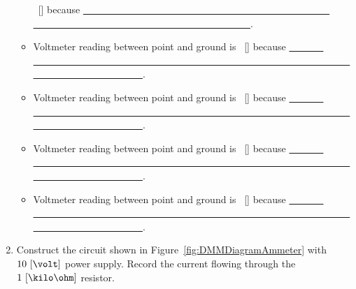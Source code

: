 \begin{enumerate}
\begin{itemize}
  \underline{\hspace{2.0 cm}}~[\volt] because
  \ul{~~~~~~~ ~~~~~~~~~ ~~~~~~~~ ~~~~~~~~~ ~~~~~ ~~~~~~~~~ ~~~~~~~ ~~~~~~
    ~~~~~~~ ~~~~~~~ ~~~~~~~~ ~~~~~~}.  
\item Voltmeter reading between point
   and ground is
  \underline{\hspace{2.0 cm}}~[\volt] because
  \ul{~~~~~~~ ~~~~~~~~~ ~~~~~~~~ ~~~~~~~~~ ~~~~~ ~~~~~~~~~ ~~~~~~~ ~~~~~~
    ~~~~~~~ ~~~~~~~ ~~~~~~~~ ~~~~~~}.  
\item Voltmeter reading between point
   and ground is
  \underline{\hspace{2.0 cm}}~[\volt] because
  \ul{~~~~~~~ ~~~~~~~~~ ~~~~~~~~ ~~~~~~~~~ ~~~~~ ~~~~~~~~~ ~~~~~~~ ~~~~~~
    ~~~~~~~ ~~~~~~~ ~~~~~~~~ ~~~~~~}.  
\item Voltmeter reading between point
   and ground is
  \underline{\hspace{2.0 cm}}~[\volt] because
  \ul{~~~~~~~ ~~~~~~~~~ ~~~~~~~~ ~~~~~~~~~ ~~~~~ ~~~~~~~~~ ~~~~~~~ ~~~~~~
    ~~~~~~~ ~~~~~~~ ~~~~~~~~ ~~~~~~}.  
\item Voltmeter reading between point
   and ground is
  \underline{\hspace{2.0 cm}}~[\volt] because
  \ul{~~~~~~~ ~~~~~~~~~ ~~~~~~~~ ~~~~~~~~~ ~~~~~ ~~~~~~~~~ ~~~~~~~ ~~~~~~
    ~~~~~~~ ~~~~~~~ ~~~~~~~~ ~~~~~~}.  
\end{itemize}

  
\item Construct the circuit shown in Figure~\ref{fig:DMMDiagramAmmeter} with $10~[\volt]$ power supply. Record the current flowing through the  $1~[\kilo\ohm]$ resistor. 
  

\end{enumerate}
